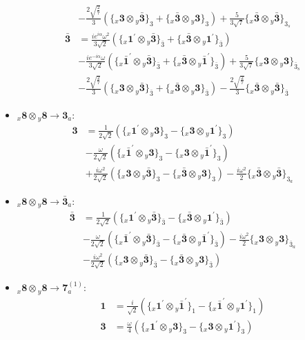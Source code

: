 \documentclass[english]{article}
\newcommand{\rep}[1]{\mathbf{#1}}
\newcommand{\repx}[2]{{}_{#2}\mathbf{#1}}
\newcommand{\tsprodx}[2]{\repx{#1}{x}\otimes\repx{#2}{y}}
\newcommand{\subcgt}[3]{\big\{ \tsprodx{#1}{#2}\big\}^{}_{#3}}
\begin{document}
\begin{itemize}
\begin{align*}
 & -\frac{2 \sqrt{\frac{2}{7}}}{3}\left(\subcgt{3}{\bar{3}}{3}+\subcgt{\bar{3}}{3}{3}\right)+\frac{5}{3 \sqrt{7}}\subcgt{\bar{3}}{\bar{3}}{3_{s}}
\\
\rep{\bar{3}} & = \frac{i e^{i \alpha } \omega ^2}{3 \sqrt{2}}\left(\subcgt{1^{\prime}}{\bar{3}}{\bar{3}}+\subcgt{\bar{3}}{1^{\prime}}{\bar{3}}\right) \\ 
 & -\frac{i e^{-i \alpha } \omega }{3 \sqrt{2}}\left(\subcgt{\bar{1}^{\prime}}{\bar{3}}{\bar{3}}+\subcgt{\bar{3}}{\bar{1}^{\prime}}{\bar{3}}\right)+\frac{5}{3 \sqrt{7}}\subcgt{3}{3}{\bar{3}_{s}} \\ 
 & -\frac{2 \sqrt{\frac{2}{7}}}{3}\left(\subcgt{3}{\bar{3}}{\bar{3}}+\subcgt{\bar{3}}{3}{\bar{3}}\right)-\frac{2 \sqrt{\frac{2}{7}}}{3}\subcgt{\bar{3}}{\bar{3}}{\bar{3}}
\end{align*}
\item $\tsprodx{8}{8}\to\rep{3}_{a}$:
\begin{align*}
\rep{3} & = \frac{1}{2 \sqrt{2}}\left(\subcgt{1^{\prime}}{3}{3}-\subcgt{3}{1^{\prime}}{3}\right) \\ 
 & -\frac{\omega }{2 \sqrt{2}}\left(\subcgt{\bar{1}^{\prime}}{3}{3}-\subcgt{3}{\bar{1}^{\prime}}{3}\right) \\ 
 & +\frac{i \omega ^2}{2 \sqrt{2}}\left(\subcgt{3}{\bar{3}}{3}-\subcgt{\bar{3}}{3}{3}\right)-\frac{i \omega ^2}{2}\subcgt{\bar{3}}{\bar{3}}{3_{a}}
\end{align*}
\item $\tsprodx{8}{8}\to\rep{\bar{3}}_{a}$:
\begin{align*}
\rep{\bar{3}} & = \frac{1}{2 \sqrt{2}}\left(\subcgt{1^{\prime}}{\bar{3}}{\bar{3}}-\subcgt{\bar{3}}{1^{\prime}}{\bar{3}}\right) \\ 
 & -\frac{\omega }{2 \sqrt{2}}\left(\subcgt{\bar{1}^{\prime}}{\bar{3}}{\bar{3}}-\subcgt{\bar{3}}{\bar{1}^{\prime}}{\bar{3}}\right)-\frac{i \omega ^2}{2}\subcgt{3}{3}{\bar{3}_{a}} \\ 
 & -\frac{i \omega ^2}{2 \sqrt{2}}\left(\subcgt{3}{\bar{3}}{\bar{3}}-\subcgt{\bar{3}}{3}{\bar{3}}\right)
\end{align*}
\item $\tsprodx{8}{8}\to\rep{7}_{a}^{(1)}$:
\begin{align*}
\rep{1} & = \frac{i}{\sqrt{2}}\left(\subcgt{1^{\prime}}{\bar{1}^{\prime}}{1}-\subcgt{\bar{1}^{\prime}}{1^{\prime}}{1}\right)
\\
\rep{3} & = \frac{\omega }{4}\left(\subcgt{1^{\prime}}{3}{3}-\subcgt{3}{1^{\prime}}{3}\right) \\ 

\end{align*}
\end{itemize}
\end{document}

